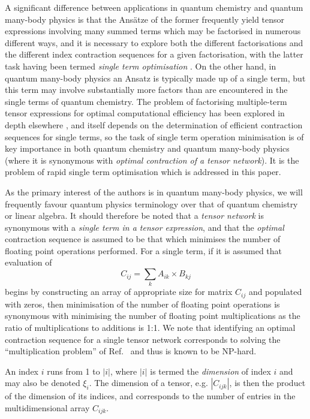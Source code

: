 \documentclass[aps,pre,reprint,superscriptaddress,amsfonts,amsmath,showpacs,nofootinbib,floatfix]{revtex4-1}
\newcommand{\rcite}[1]{Ref.~\onlinecite{#1}}
\begin{document}
A significant difference between applications in quantum chemistry and quantum many-body physics is that the Ans\"atze of the former frequently yield tensor expressions involving many summed terms which may be factorised in numerous different ways, and it is necessary to explore both the different factorisations and the different index contraction sequences for a given factorisation, with the latter task having been termed \emph{single term optimisation} \cite{hartono2005}. On the other hand, in quantum many-body physics an Ansatz is typically made up of a single term, but this term may involve substantially more factors than are encountered in the single terms of quantum chemistry. 
The problem of factorising multiple-term tensor expressions for optimal computational efficiency has been explored in depth elsewhere \cite{hartono2005,hartono2006}, and itself depends on the determination of efficient contraction sequences for single terms, so the task of single term operation minimisation is of key importance in both quantum chemistry and quantum many-body physics (where it is synonymous with \emph{optimal contraction of a tensor network}). It is the problem of rapid single term optimisation which is addressed in this paper.

As the primary interest of the authors is in quantum many-body physics, we will frequently favour quantum physics terminology over that of quantum chemistry or linear algebra. It should therefore be noted that a \emph{tensor network} is synonymous with a \emph{single term in a tensor expression}, and that the \emph{optimal} contraction sequence is assumed to be that which minimises the number of floating point operations performed. For a single term, if it is assumed that evaluation of
\begin{equation}
C_{ij}=\sum_k A_{ik}\times B_{kj}
\end{equation}
begins by constructing an array of appropriate size for matrix $C_{ij}$ and populated with zeros, then minimisation of the number of floating point operations is synonymous with minimising the number of floating point multiplications as the ratio of multiplications to additions is 1:1. We note that identifying an optimal contraction sequence for a single tensor network corresponds to solving the ``multiplication problem'' of \rcite{lam1997} and thus is known to be NP-hard.

An index $i$ runs from 1 to $|i|$, where $|i|$ is termed the \emph{dimension} of index $i$ and may also be denoted $\xi_i$. The dimension of a tensor, e.g. $|C_{ijk}|$, is then the product of the dimension of its indices, and corresponds to the number of entries in the multidimensional array $C_{ijk}$. 
\end{document}
